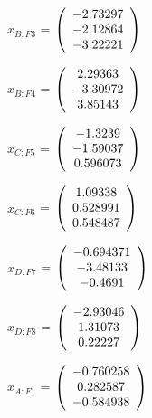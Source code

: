 \begin{description}
$x_{B:F3}$ = $\left( \begin{array} {ccc}   -2.73297 \\   -2.12864 \\   -3.22221
\end{array} \right)\\ \\$

$x_{B:F4}$ = $\left( \begin{array} {ccc}    2.29363 \\   -3.30972 \\    3.85143
\end{array} \right)\\ \\$

$x_{C:F5}$ = $\left( \begin{array} {ccc}    -1.3239 \\   -1.59037 \\   0.596073
\end{array} \right)\\ \\$

$x_{C:F6}$ = $\left( \begin{array} {ccc}    1.09338 \\   0.528991 \\   0.548487
\end{array} \right)\\ \\$

$x_{D:F7}$ = $\left( \begin{array} {ccc}  -0.694371 \\   -3.48133 \\    -0.4691
\end{array} \right)\\ \\$

$x_{D:F8}$ = $\left( \begin{array} {ccc}   -2.93046 \\    1.31073 \\    0.22227
\end{array} \right)\\ \\$

$\hat{x}_{A:F1}$ = $\left( \begin{array} {ccc}  -0.760258 \\   0.282587 \\  -0.584938
\end{array} \right)\\ \\$


\end{description}
